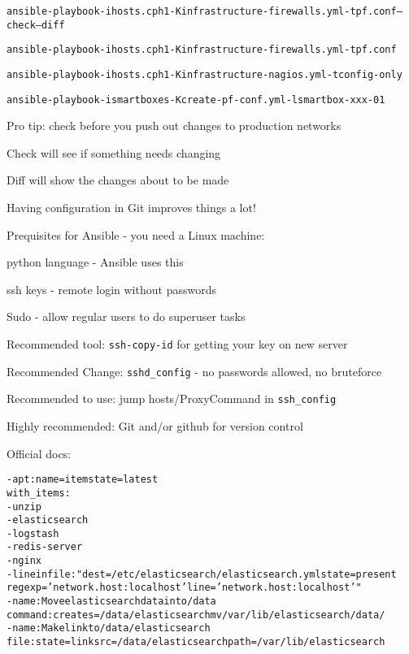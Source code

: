 \documentclass[Screen16to9,17pt]{foils}
\begin{document}

\begin{alltt}\footnotesize
ansible-playbook -i hosts.cph1 -K infrastructure-firewalls.yml -t pf.conf --check --diff

ansible-playbook -i hosts.cph1 -K infrastructure-firewalls.yml -t pf.conf

ansible-playbook -i hosts.cph1 -K infrastructure-nagios.yml -t config-only

ansible-playbook -i smartboxes -K create-pf-conf.yml -l smartbox-xxx-01
\end{alltt}

\begin{list2}
\item Pro tip: check before you push out changes to production networks \smiley
\item Check will see if something needs changing
\item Diff will show the changes about to be made
\item Having configuration in Git improves things a lot!
\end{list2}





Prequisites for Ansible - you need a Linux machine:
\begin{list2}
\item python language - Ansible uses this
\item ssh keys - remote login without passwords
\item Sudo - allow regular users to do superuser tasks
\item Recommended tool: \verb+ssh-copy-id+ for getting your key on new server
\item Recommended Change: \verb+sshd_config+ - no passwords allowed, no bruteforce
\item Recommended to use: jump hosts/ProxyCommand in \verb+ssh_config+
\item Highly recommended: Git and/or github for version control
\end{list2}

Official docs:\\




\begin{alltt}\small
- apt: name={{ item }} state=latest
  with_items:
        - unzip
        - elasticsearch
        - logstash
        - redis-server
        - nginx
- lineinfile: "dest=/etc/elasticsearch/elasticsearch.yml state=present
  regexp='network.host: localhost' line='network.host: localhost'"
- name: Move elasticsearch data into /data
  command: creates=/data/elasticsearch mv /var/lib/elasticsearch /data/
- name: Make link to /data/elasticsearch
  file: state=link src=/data/elasticsearch path=/var/lib/elasticsearch
\end{alltt}
\end{document}
